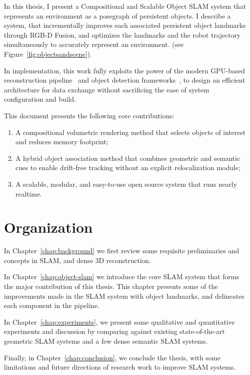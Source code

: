 In this thesis, I present a Compositional and Scalable Object SLAM system that represents an environment as a posegraph of persistent objects. I describe a system, that incrementally improves each associated persistent object landmarks through RGB-D Fusion, and optimizes the landmarks and the robot trajectory simultaneously to accurately represent an environment. (see Figure~\ref{fig:objectsandscene}).

In implementation, this work fully exploits the power of the modern GPU-based reconstruction pipeline~\cite{dongGPUAcceleratedRobust2019} and object detection frameworks~\cite{kirillovPointRendImageSegmentation2020}, to design an efficient architecture for data exchange without sacrificing the ease of system configuration and build.


This document presents the following core contributions:

\begin{enumerate}
    \item A compositional volumetric rendering method that selects objects of interest and reduces memory footprint;
    \item A hybrid object association method that combines geometric and semantic cues to enable drift-free tracking without an explicit relocalization module;
    \item A scalable, modular, and easy-to-use open source system that runs nearly realtime.
\end{enumerate}

\section{Organization}

In Chapter~\ref{chap:background} we first review some requisite preliminaries and concepts in SLAM, and dense 3D reconstruction.

\noindent In Chapter~\ref{chap:object-slam} we introduce the core SLAM system that forms the major contribution of this thesis. This chapter presents some of the improvements made in the SLAM system with object landmarks, and delineates each component in the pipeline.

\noindent In Chapter~\ref{chap:experiments}, we present some qualitative and quantitative experiments and discussion by comparing against existing state-of-the-art geometric SLAM systems and a few dense semantic SLAM systems.

\noindent Finally, in Chapter~\ref{chap:conclusion}, we conclude the thesis, with some limitations and future directions of research work to improve SLAM systems.
